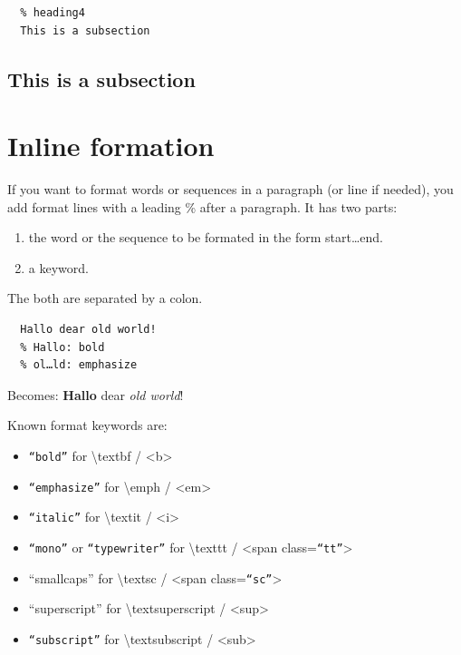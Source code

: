 \documentclass{article}
\begin{document}
\begin{verbatim}
  % heading4
  This is a subsection
\end{verbatim}


\subsection{This is a subsection}

\section{Inline formation}

{If you want to format words or sequences in a paragraph (or
line if needed), you add format lines with a leading \% after
a paragraph. It has two parts:\\}

\begin{enumerate}
\item the word or the sequence to be formated in the form
  start…end. 
\item a keyword.
\end{enumerate}


{The both are separated by a colon.\\}

\begin{verbatim}
  Hallo dear old world!
  % Hallo: bold
  % ol…ld: emphasize
\end{verbatim}


{Becomes:
\textbf{Hallo} dear \emph{old world}!\\}

{Known format keywords are:\\}

\begin{itemize}
\item \texttt{“bold”} for \textbackslash textbf / <b>
\item \texttt{“emphasize”} for \textbackslash emph / <em>
\item \texttt{“italic”} for \textbackslash textit / <i>
\item \texttt{“mono”} or \texttt{“typewriter”} for \textbackslash texttt / <span class=\texttt{“tt”}>
\item “smallcaps” for \textbackslash textsc / <span class=\texttt{“sc”}>
\item “superscript” for \textbackslash textsuperscript / <sup>
\item \texttt{“subscript”} for \textbackslash textsubscript / <sub>
\end{itemize}
\end{document}
